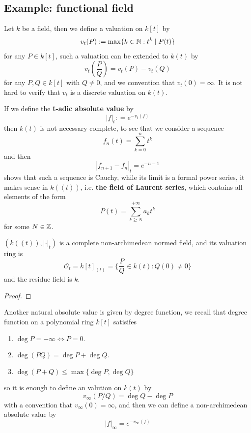 \subsection*{Example: functional field}

Let \(k\) be a field, then we define a valuation on \(k[t]\) by
\[v_t(P) := \max \{k \in \mathbb{N}: t^k \mid P(t)\}\]
for any \(P \in k[t]\), such a valuation can be extended to \(k(t)\) by
\[v_t\left(\frac{P}{Q}\right) = v_t(P) - v_t(Q)\]
for any \(P,Q \in k[t]\) with \(Q \neq 0\), and we convention that \(v_t(0) = \infty\). It is not hard to verify that \(v_t\) is a discrete valuation on \(k(t)\).

\begin{example}
    If we define the \textbf{t-adic absolute value} by
    \[|f|_t : = e^{-v_t(f)}\]
    then \(k(t)\) is not necessary complete, to see that we consider a sequence
    \[f_n(t) = \sum_{k=0}^n t^k\]
    and then 
    \[|f_{n+1}-f_n|_t = e^{-n-1}\]
    shows that such a sequence is Cauchy, while its limit is a formal power series, it makes sense in \(k((t))\), i.e. \textbf{the field of Laurent series}, which contains all elements of the form
    \[P(t) = \sum_{k \geq N}^{+\infty}a_k t^k\]
    for some \(N \in \mathbb{Z}\).
\end{example}


\begin{proposition}
    \((k((t)),|\cdot|_t)\) is a complete non-archimedean normed field, and its valuation ring is
    \[\mathcal{O}_t = k[t]_{(t)} = \{\frac{P}{Q} \in k(t) : Q(0) \neq 0\}\]
    and the residue field is \(k\).
\end{proposition}

\begin{proof}
    
\end{proof}

Another natural absolute value is given by degree function, we recall that degree function on a polynomial ring \(k[t]\) satisifes
\begin{enumerate}
    \item \(\deg P = -\infty \iff P = 0 \).
    \item \(\deg(PQ) = \deg P + \deg Q\).
    \item \(\deg(P+Q) \leq \max\{\deg P,\deg Q\}\)
\end{enumerate}
so it is enough to define an valution on \(k(t)\) by
\[v_\infty(P/Q) = \deg Q - \deg P\]
with a convention that \(v_\infty(0) = \infty\), and then we can define a non-archimedean absolute value by
\[|f|_{\infty} = e^{-v_{\infty}(f)}\]

